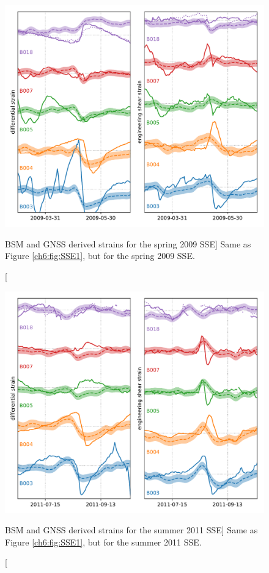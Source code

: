 \begin{figure}
\includegraphics{ch6/figures/SSE0.pdf}
\caption
[BSM and GNSS derived strains for the spring 2009 SSE]
{Same as Figure \ref{ch6:fig:SSE1}, but for the spring 2009 SSE.}   
\label{ch6:fig:SSE0}
\end{figure}

\begin{figure}
\includegraphics{ch6/figures/SSE2.pdf}
\caption
[BSM and GNSS derived strains for the summer 2011 SSE]
{Same as Figure \ref{ch6:fig:SSE1}, but for the summer 2011 SSE.}   
\label{ch6:fig:SSE2}
\end{figure}

